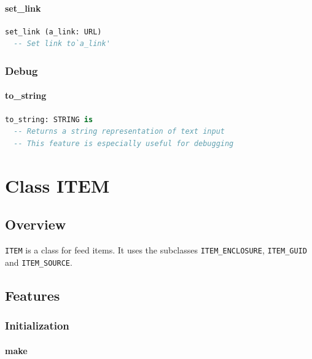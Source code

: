 \subsubsection{set\_link}

\begin{lstlisting}[language=Eiffel]
set_link (a_link: URL)
  -- Set link to`a_link'
\end{lstlisting}

\subsection{Debug}
\label{sec:channel-text-input-debug}

\subsubsection{to\_string}

\begin{lstlisting}[language=Eiffel]
to_string: STRING is
  -- Returns a string representation of text input
  -- This feature is especially useful for debugging
\end{lstlisting}


\chapter{Class ITEM}
\label{sec:feed-item}


\section{Overview}
\label{sec:feed-item-overview}

\texttt{ITEM} is a class for feed items. It uses the subclasses
\texttt{ITEM\_ENCLOSURE}, \texttt{ITEM\_GUID} and \texttt{ITEM\_SOURCE}.


\section{Features}
\label{sec:feed-item-features}


\subsection{Initialization}
\label{sec:item-initialization}

\subsubsection{make}

